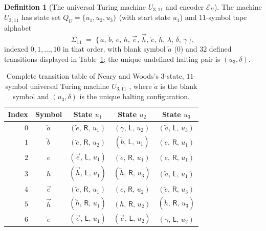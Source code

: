 \documentclass[11pt,reqno]{amsart}
\numberwithin{equation}{section}
\theoremstyle{plain}
\theoremstyle{definition}
\newtheorem{definition}[theorem]{Definition}
\theoremstyle{remark}
\begin{document}
\begin{definition}[The universal Turing machine $U_{3,11}$ and encoder $\mathcal{E}_U$]\label{def:u311}
The machine $U_{3,11}$ has state set $Q_U = \{u_1, u_2, u_3\}$ (with start state $u_1$) and $11$-symbol tape alphabet
\[
  \Sigma_{11} \;=\; \bigl\{\,\overleftarrow{a},\, \overleftarrow{b},\, e,\, h,\, \overrightarrow{e},\, \overrightarrow{h},\, \overleftarrow{e},\, \overleftarrow{h},\, \lambda,\, \delta,\, \gamma\,\bigr\},
\]
indexed $0, 1, \dots, 10$ in that order, with blank symbol $\overleftarrow{a}$ ($0$) and $32$ defined transitions displayed in Table~\ref{tab:u311}; the unique undefined halting pair is $(u_3, \delta)$.

\begin{table}[htbp]
\centering
\caption{Complete transition table of Neary and Woods's $3$-state, $11$-symbol universal Turing machine $U_{3,11}$ \cite{NearyWoods2006SmallFast,Neary2008Thesis}, where $\overleftarrow{a}$ is the blank symbol and $(u_3, \delta)$ is the unique halting configuration.}\label{tab:u311}
\small
\begin{tabular}{@{}rc@{\qquad}ccc@{}}
\toprule
Index & Symbol & State $u_1$ & State $u_2$ & State $u_3$ \\
\midrule
$0$  & $\overleftarrow{a}$ & $(\overleftarrow{e},\, \mathsf{R},\, u_1)$ & $(\gamma,\, \mathsf{L},\, u_2)$           & $(\overleftarrow{a},\, \mathsf{L},\, u_3)$ \\
$1$  & $\overleftarrow{b}$ & $(\overleftarrow{e},\, \mathsf{R},\, u_2)$ & $(\overleftarrow{b},\, \mathsf{L},\, u_1)$ & $(e,\, \mathsf{R},\, u_1)$ \\
$2$  & $e$                 & $(\overrightarrow{e},\, \mathsf{L},\, u_1)$ & $(\overleftarrow{e},\, \mathsf{R},\, u_1)$ & $(e,\, \mathsf{R},\, u_1)$ \\
$3$  & $h$                 & $(\overrightarrow{h},\, \mathsf{L},\, u_1)$ & $(\overleftarrow{h},\, \mathsf{R},\, u_3)$ & $(\overleftarrow{a},\, \mathsf{L},\, u_1)$ \\
$4$  & $\overrightarrow{e}$ & $(\overleftarrow{e},\, \mathsf{R},\, u_1)$ & $(e,\, \mathsf{R},\, u_2)$                 & $(\overleftarrow{e},\, \mathsf{R},\, u_3)$ \\
$5$  & $\overrightarrow{h}$ & $(\overleftarrow{h},\, \mathsf{R},\, u_1)$ & $(h,\, \mathsf{R},\, u_2)$                 & $(\overleftarrow{h},\, \mathsf{R},\, u_3)$ \\
$6$  & $\overleftarrow{e}$ & $(\overrightarrow{e},\, \mathsf{L},\, u_1)$ & $(\overrightarrow{e},\, \mathsf{L},\, u_2)$ & $(\gamma,\, \mathsf{L},\, u_2)$ \\

\end{tabular}
\end{table}
\end{definition}
\end{document}
